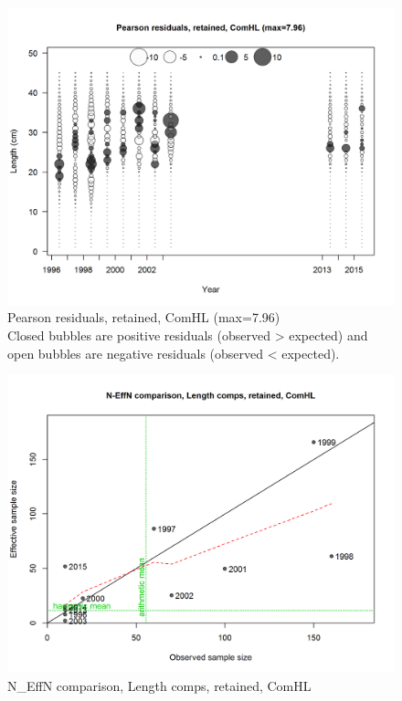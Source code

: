 \documentclass[12pt,]{article}
\begin{document}
\begin{figure}[htbp]
\centering
\includegraphics{./r4ss/plots_mod1/comp_lenfit_residsflt1mkt2.png}
\caption{Pearson residuals, retained, ComHL (max=7.96)\\
Closed bubbles are positive residuals (observed \textgreater{} expected)
and open bubbles are negative residuals (observed \textless{} expected).
\label{fig:mod1_2_comp_lenfit_residsflt1mkt2}}
\end{figure}

\begin{figure}[htbp]
\centering
\includegraphics{./r4ss/plots_mod1/comp_lenfit_sampsize_flt1mkt2.png}
\caption{N\_EffN comparison, Length comps, retained, ComHL
\label{fig:mod1_3_comp_lenfit_sampsize_flt1mkt2}}
\end{figure}
\end{document}
